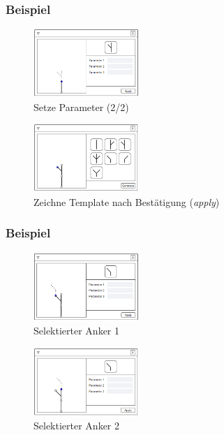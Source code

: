 \documentclass[12pt]{beamer}
\begin{document}
    \begin{frame}
        \frametitle{Beispiel}
        \begin{figure}
            \centering
            \includegraphics[width=4cm]{../images/UI_4.PNG}
            \caption{Setze Parameter (2/2)}
        \end{figure}
        \begin{figure}
            \centering
            \includegraphics[width=4cm]{../images/UI_5.PNG}
            \caption{Zeichne Template nach Bestätigung (\textit{apply})}
        \end{figure}
    \end{frame}

    \begin{frame}
        \frametitle{Beispiel}
        \begin{figure}
            \centering
            \includegraphics[width=4cm]{../images/UI_6.PNG}
            \caption{Selektierter Anker 1}
        \end{figure}
        \begin{figure}
            \centering
            \includegraphics[width=4cm]{../images/UI_7.PNG}
            \caption{Selektierter Anker 2}
        \end{figure}
    \end{frame}
\end{document}
